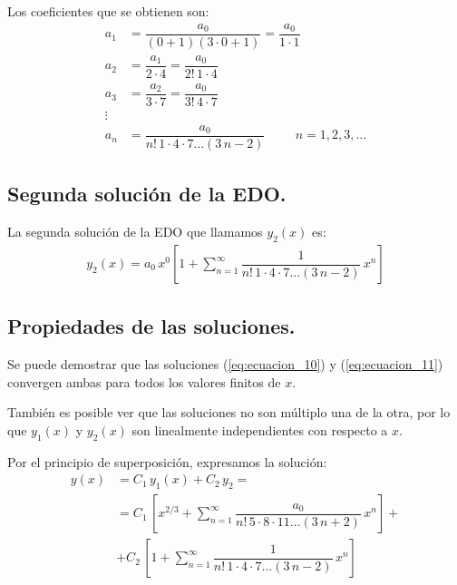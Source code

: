 Los coeficientes que se obtienen son:
\begin{align*}
a_{1} &= \dfrac{a_{0}}{(0+1)(3 \cdot 0 +1)} = \dfrac{a_{0}}{1 \cdot 1} \\[0.5em] 
a_{2} &= \dfrac{a_{1}}{2 \cdot 4} = \dfrac{a_{0}}{2! \, 1 \cdot 4}  \\[0.5em] 
a_{3} &= \dfrac{a_{2}}{3 \cdot 7} = \dfrac{a_{0}}{3! \, 4 \cdot 7}  \\[0.5em]
\vdots \\ 
a_{n} &= \dfrac{a_{0}}{n! \, 1 \cdot 4 \cdot 7 \ldots (3 \, n - 2)} \hspace{1cm} n = 1, 2, 3, \ldots
\end{align*}

\subsection*{Segunda solución de la EDO.}

La segunda solución de la EDO que llamamos $y_{2}(x)$ es:
\begin{align}
y_{2}(x) = a_{0} \, x^{0} \left[ 1 + \sum_{n=1}^{\infty} \dfrac{1}{n! \, 1 \cdot 4 \cdot 7 \ldots (3\, n - 2)} \, x^{n} \right]
\label{eq:ecuacion_11}
\end{align}    

\subsection*{Propiedades de las soluciones.}

Se puede demostrar que las soluciones (\ref{eq:ecuacion_10}) y (\ref{eq:ecuacion_11}) convergen ambas para todos los valores finitos de $x$.
\par
También es posible ver que las soluciones no son múltiplo una  de la otra, por lo que $y_{1}(x)$ y $y_{2}(x)$ son linealmente independientes con respecto a $x$.
\par
Por el principio de superposición, expresamos la solución:
\begin{align*}
y(x) &= C_{1} \, y_{1} (x) + C_{2} \, y_{2} = \\[0.5em]
&= C_{1} \, \left[ x^{2/3} + \sum_{n=1}^{\infty} \dfrac{a_{0}}{n! \, 5 \cdot 8 \cdot 11 \ldots (3\, n + 2)} \, x^{n} \right] + \\[0.5em]
&+ C_{2} \, \left[ 1 + \sum_{n=1}^{\infty} \dfrac{1}{n! \, 1 \cdot 4 \cdot 7 \ldots (3\, n - 2)} \, x^{n} \right]
\end{align*}

